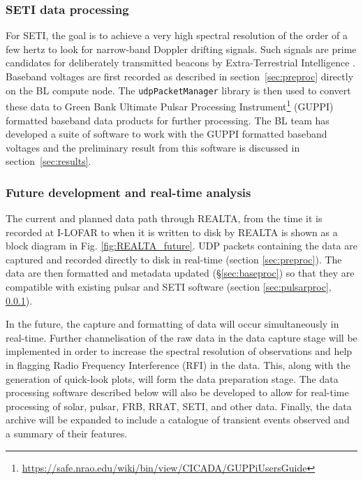 

\subsubsection{SETI data processing}
\label{sect:pipeline_SETI}
For SETI, the goal is to achieve a very high spectral resolution of the order of a few hertz to look for narrow-band Doppler drifting signals. Such signals are prime candidates for deliberately transmitted beacons by Extra-Terrestrial Intelligence \citep[ETI;][]{Tarter2001}. Baseband voltages are first recorded as described in section~\ref{sec:preproc} directly on the BL compute node. The \texttt{udpPacketManager} library is then used to convert these data to Green Bank Ultimate Pulsar Processing Instrument\footnote{\hyperref[GUPPI]{https://safe.nrao.edu/wiki/bin/view/CICADA/GUPPiUsersGuide}} (GUPPI) formatted baseband data products for further processing. The BL team has developed a suite of software to work with the GUPPI formatted baseband voltages \citep{Lebofsky2019} and the preliminary result from this software is discussed in section~\ref{sec:results}. 

\subsubsection{Future development and real-time analysis}
\label{sec:future_software}
The current and planned data path through REALTA, from the time it is recorded at I-LOFAR to when it is written to disk by REALTA is shown as a block diagram in Fig. \ref{fig:REALTA_future}. UDP packets containing the data are captured and recorded directly to disk in real-time (section \ref{sec:preproc}). The data are then formatted and metadata updated (\S \ref{sec:baseproc}) so that they are compatible with existing pulsar and SETI software (section \ref{sec:pulsarproc}, \ref{sect:pipeline_SETI}).

In the future, the capture and formatting of data will occur simultaneously in real-time. Further channelisation of the raw data in the data capture stage will be implemented in order to increase the spectral resolution of observations and help in flagging Radio Frequency Interference (RFI) in the data. This, along with the generation of quick-look plots, will form the data preparation stage. The data processing software described below will also be developed to allow for real-time processing of solar, pulsar, FRB, RRAT, SETI, and other data. Finally, the data archive will be expanded to include a catalogue of transient events observed and a summary of their features.

